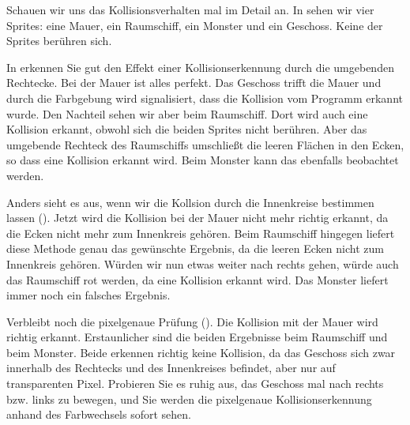 Schauen wir uns das Kollisionsverhalten mal im Detail an. In  sehen wir vier Sprites: eine Mauer, ein Raumschiff, ein Monster und ein Geschoss. Keine der Sprites berühren sich.



In  erkennen Sie gut den Effekt einer Kollisionserkennung durch die umgebenden Rechtecke. Bei der Mauer ist alles perfekt. Das Geschoss trifft die Mauer und durch die Farbgebung wird signalisiert, dass die Kollision vom Programm erkannt wurde. Den Nachteil sehen wir aber beim Raumschiff. Dort wird auch eine Kollision erkannt, obwohl sich die beiden Sprites nicht berühren. Aber das umgebende Rechteck des Raumschiffs umschließt die leeren Flächen in den Ecken, so dass eine Kollision erkannt wird. Beim Monster kann das ebenfalls beobachtet werden. 


Anders sieht es aus, wenn wir die Kollsion durch die Innenkreise bestimmen lassen (). Jetzt wird die Kollision bei der Mauer nicht mehr richtig erkannt, da die Ecken nicht mehr zum Innenkreis gehören. Beim Raumschiff hingegen liefert diese Methode genau das gewünschte Ergebnis, da die leeren Ecken nicht zum Innenkreis gehören. Würden wir nun etwas weiter nach rechts gehen, würde auch das Raumschiff rot werden, da eine Kollision erkannt wird. Das Monster liefert immer noch ein falsches Ergebnis.


Verbleibt noch die pixelgenaue Prüfung (). Die Kollision mit der Mauer wird richtig erkannt. Erstaunlicher sind die beiden Ergebnisse beim Raumschiff und beim Monster. Beide erkennen richtig keine Kollision, da das Geschoss sich zwar innerhalb des Rechtecks und des Innenkreises befindet, aber nur auf transparenten Pixel. Probieren Sie es ruhig aus, das Geschoss mal nach rechts bzw. links zu bewegen, und Sie werden die pixelgenaue Kollisionserkennung anhand des Farbwechsels sofort sehen. 

